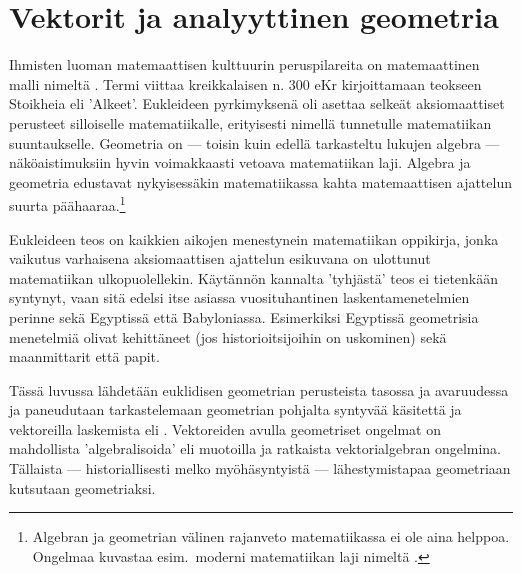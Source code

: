 \chapter{Vektorit ja analyyttinen geometria}

Ihmisten luoman matemaattisen kulttuurin peruspilareita on matemaattinen malli nimeltä 
. Termi viittaa kreikkalaisen 
%
 n. 300 eKr kirjoittamaan teokseen Stoikheia eli 'Alkeet'. Eukleideen
pyrkimyksenä oli asettaa selkeät aksiomaattiset perusteet silloiselle matematiikalle,
erityisesti  nimellä tunnetulle matematiikan suuntaukselle. Geometria on ---
toisin kuin edellä tarkasteltu lukujen algebra --- näköaistimuksiin hyvin voimakkaasti vetoava
matematiikan laji. Algebra ja geometria edustavat nykyisessäkin matematiikassa kahta
matemaattisen ajattelun suurta päähaaraa.\footnote[2]{Algebran ja geometrian välinen rajanveto
matematiikassa ei ole aina helppoa. Ongelmaa kuvastaa esim.\ moderni matematiikan laji nimeltä
.}

Eukleideen teos on kaikkien aikojen menestynein matematiikan oppikirja, jonka vaikutus
varhaisena aksiomaattisen ajattelun esikuvana on ulottunut matematiikan ulkopuolellekin.
Käytännön kannalta 'tyhjästä' teos ei tietenkään syntynyt, vaan sitä edelsi itse asiassa
vuosituhantinen laskentamenetelmien perinne sekä Egyptissä että Babyloniassa. Esimerkiksi
Egyptissä geometrisia menetelmiä olivat kehittäneet (jos historioitsijoihin on uskominen) sekä
maanmittarit että papit.

Tässä luvussa lähdetään euklidisen geometrian perusteista tasossa ja avaruudessa ja paneudutaan
tarkastelemaan geometrian pohjalta syntyvää  käsitettä ja vektoreilla laskemista 
eli . Vektoreiden avulla geometriset ongelmat on mahdollista 
'algebralisoida' eli muotoilla ja ratkaista vektorialgebran ongelmina. Tällaista --- 
historiallisesti melko myöhäsyntyistä --- lähestymistapaa geometriaan kutsutaan 
 geometriaksi.